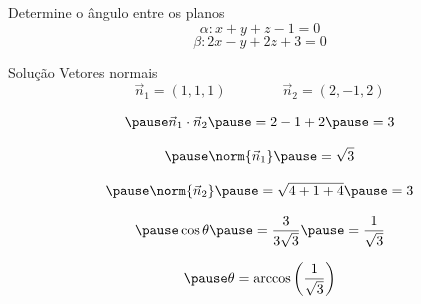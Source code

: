 \begin{question}
  Determine o ângulo entre os planos
  \[
    \alpha\colon x + y + z - 1 = 0
  \]
  \[
    \beta\colon 2x - y + 2z + 3 = 0
  \]
\end{question}

\begin{resolution}{Solução}
  Vetores normais
  \[
    \vec{n}_{1} = (1,  1, 1)
    \qquad\qquad
    \vec{n}_{2} = (2, -1, 2)
  \]

  \[
    \pause
    \vec{n}_{1}\cdot\vec{n}_{2}
    \pause
    = 2 - 1 + 2
    \pause
    = 3
  \]

  \[
    \pause
    \norm{\vec{n}_{1}}
    \pause
    = \sqrt{3}
  \]

  \[
    \pause
    \norm{\vec{n}_{2}}
    \pause
    = \sqrt{4 + 1 + 4}
    \pause
    = 3
  \]

  \[
    \pause
    \cos{\theta}
    \pause
    = \frac{3}{3\sqrt{3}}
    \pause
    = \frac{1}{\sqrt{3}}
  \]

  \[
    \pause
    \theta
    = \arccos{\left(\frac{1}{\sqrt{3}}\right)}
  \]
\end{resolution}

\endinput